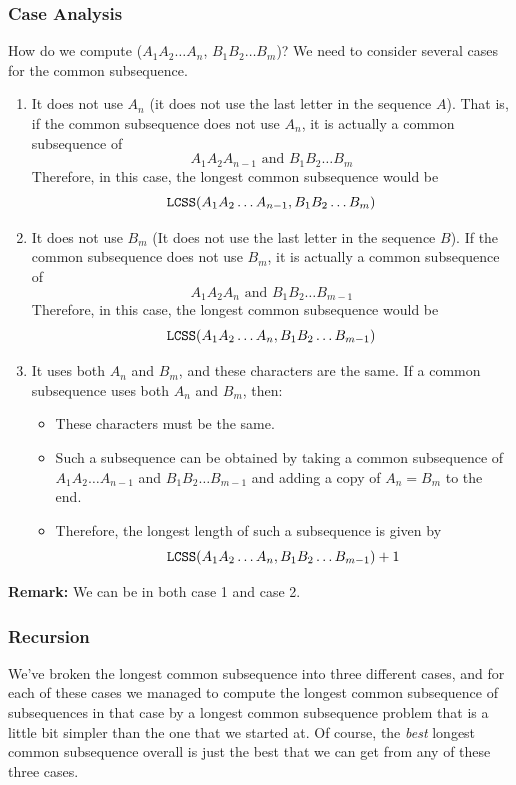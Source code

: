 \documentclass[letterpaper]{article}
\begin{document}
\subsubsection{Case Analysis}
How do we compute ($A_1 A_2 \dots A_n$, $B_1 B_2 \dots B_m$)? We need to consider several cases for the common subsequence. 
\begin{enumerate}
    \item It does not use $A_n$ (it does not use the last letter in the sequence $A$). That is, if the common subsequence does not use $A_n$, it is actually a common subsequence of 
    \[A_1 A_2 A_{n - 1} \text{ and } B_1 B_2 \dots B_m\]
    Therefore, in this case, the longest common subsequence would be 
    \[\texttt{LCSS}(A_1 A_2 \dots A_{n - 1}, B_1 B_2 \dots B_m)\]


    \item It does not use $B_m$ (It does not use the last letter in the sequence $B$). If the common subsequence does not use $B_m$, it is actually a common subsequence of 
    \[A_1 A_2 A_n \text{ and } B_1 B_2 \dots B_{m - 1}\]
    Therefore, in this case, the longest common subsequence would be 
    \[\texttt{LCSS}(A_1 A_2 \dots A_n, B_1 B_2 \dots B_{m - 1})\]

    
    \item It uses both $A_n$ and $B_m$, and these characters are the same. If a common subsequence uses both $A_n$ and $B_m$, then:
    \begin{itemize}
        \item These characters must be the same.
        \item Such a subsequence can be obtained by taking a common subsequence of $A_1 A_2 \dots A_{n - 1}$ and $B_1 B_2 \dots B_{m - 1}$ and adding a copy of $A_n = B_m$ to the end. 
        \item Therefore, the longest length of such a subsequence is given by 
        \[\texttt{LCSS}(A_1 A_2 \dots A_n, B_1 B_2 \dots B_{m - 1}) + 1\]
    \end{itemize}
\end{enumerate}
\textbf{Remark:} We can be in both case 1 and case 2.

\subsubsection{Recursion}
We've broken the longest common subsequence into three different cases, and for each of these cases we managed to compute the longest common subsequence of subsequences in that case by a longest common subsequence problem that is a little bit simpler than the one that we started at. Of course, the \emph{best} longest common subsequence overall is just the best that we can get from any of these three cases. 
\end{document}
